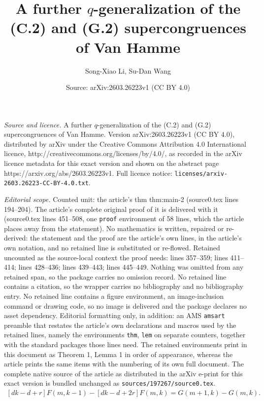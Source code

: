 \documentclass[10pt,a4paper]{amsart}
\title{A further $q$-generalization of the (C.2) and (G.2) supercongruences of Van Hamme}
\author{Song-Xiao Li, Su-Dan Wang}
\date{Source: arXiv:2603.26223v1 (CC BY 4.0)}
\begin{document}
\maketitle

\noindent\emph{Source and licence.} A further $q$-generalization of the (C.2) and (G.2) supercongruences of Van Hamme. Version arXiv:2603.26223v1 (CC BY 4.0), distributed by arXiv under the Creative Commons Attribution 4.0 International licence, http://creativecommons.org/licenses/by/4.0/, as recorded in the arXiv licence metadata for this exact version and shown on the abstract page https://arxiv.org/abs/2603.26223v1. Full licence notice: \texttt{licenses/arxiv-2603.26223-CC-BY-4.0.txt}.\par\smallskip

\noindent\textit{Editorial scope.} Counted unit: the article's thm thm:main-2 (source0.tex lines 194--204). The article's complete original proof of it is delivered with it (source0.tex lines 451--508, one \texttt{proof} environment of 58 lines, which the article places away from the statement). No mathematics is written, repaired or re-derived: the statement and the proof are the article's own lines, in the article's own notation, and no retained line is substituted or re-flowed.  Retained uncounted as the source-local context the proof needs: lines 357--359; lines 411--414; lines 428--436; lines 439--443; lines 445--449.  Nothing was omitted from any retained span, so the package carries no omission record.  No retained line contains a citation, so the wrapper carries no bibliography and no bibliography entry.  No retained line contains a figure environment, an image-inclusion command or drawing code, so no image is delivered and the package declares no asset dependency.  Editorial formatting only, in addition: an AMS \texttt{amsart} preamble that restates the article's own declarations and macros used by the retained lines, namely the environments \texttt{thm}, \texttt{lem} on separate counters, together with the standard packages those lines need.  The retained environments print in this document as Theorem 1, Lemma 1 in order of appearance, whereas the article prints the same items with the numbering of its own full document.  The complete native source of the article as distributed in the arXiv e-print for this exact version is bundled unchanged as \texttt{sources/197267/source0.tex}.
\begin{align}\label{eq:qz}
    [dk-d+r]F(m,k-1)-[dk-d+2r]F(m,k)=G(m+1,k)-G(m,k).
\end{align}
\end{document}
